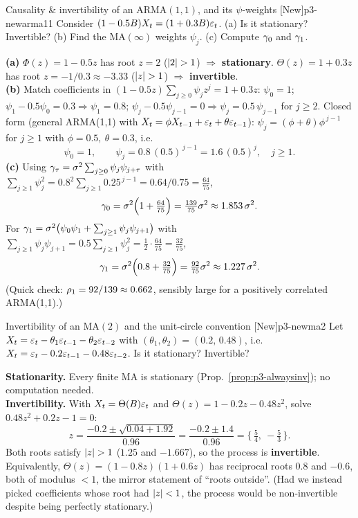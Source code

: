 \begin{exercise}{Causality \& invertibility of an $\mathrm{ARMA}(1,1)$, and its $\psi$-weights \quad\textnormal{[New]}}{p3-newarma11}
Consider $(1-0.5B)X_t=(1+0.3B)\varepsilon_t$. (a) Is it stationary? Invertible?
(b) Find the $\mathrm{MA}(\infty)$ weights $\psi_j$. (c) Compute $\gamma_0$ and
$\gamma_1$.
\end{exercise}
\begin{solution}
\textbf{(a)} $\Phi(z)=1-0.5z$ has root $z=2$ ($\left\lvert 2 \right\rvert>1$) $\Rightarrow$
\textbf{stationary}. $\Theta(z)=1+0.3z$ has root $z=-1/0.3\approx-3.33$
($\left\lvert z \right\rvert>1$) $\Rightarrow$ \textbf{invertible}.\\
\textbf{(b)} Match coefficients in $(1-0.5z)\sum_{j\ge0}\psi_j z^j=1+0.3z$:
$\psi_0=1$; $\psi_1-0.5\psi_0=0.3\Rightarrow\psi_1=0.8$;
$\psi_j-0.5\psi_{j-1}=0\Rightarrow\psi_j=0.5\,\psi_{j-1}$ for $j\ge2$. Closed
form (general ARMA(1,1) with $X_t=\phi X_{t-1}+\varepsilon_t+\theta\varepsilon_{t-1}$):
$\psi_j=(\phi+\theta)\phi^{\,j-1}$ for $j\ge1$ with $\phi=0.5,\ \theta=0.3$, i.e.
\[
\psi_0=1,\qquad \psi_j=0.8\,(0.5)^{\,j-1}=1.6\,(0.5)^{j},\quad j\ge1 .
\]
\textbf{(c)} Using $\gamma_\tau=\sigma^2\sum_{j\ge0}\psi_j\psi_{j+\tau}$ with
$\sum_{j\ge1}\psi_j^2=0.8^2\sum_{j\ge1}0.25^{\,j-1}=0.64/0.75=\tfrac{64}{75}$,
\[
\gamma_0=\sigma^2\Big(1+\tfrac{64}{75}\Big)=\tfrac{139}{75}\sigma^2\approx1.853\,\sigma^2 .
\]
For $\gamma_1=\sigma^2\big(\psi_0\psi_1+\sum_{j\ge1}\psi_j\psi_{j+1}\big)$ with
$\sum_{j\ge1}\psi_j\psi_{j+1}=0.5\sum_{j\ge1}\psi_j^2=\tfrac12\cdot\tfrac{64}{75}=\tfrac{32}{75}$,
\[
\gamma_1=\sigma^2\Big(0.8+\tfrac{32}{75}\Big)=\tfrac{92}{75}\sigma^2\approx1.227\,\sigma^2 .
\]
(Quick check: $\rho_1=92/139\approx0.662$, sensibly large for a positively
correlated ARMA(1,1).)
\end{solution}

\begin{exercise}{Invertibility of an $\mathrm{MA}(2)$ and the unit-circle convention \quad\textnormal{[New]}}{p3-newma2}
Let $X_t=\varepsilon_t-\theta_1\varepsilon_{t-1}-\theta_2\varepsilon_{t-2}$ with
$(\theta_1,\theta_2)=(0.2,\,0.48)$, i.e.\
$X_t=\varepsilon_t-0.2\varepsilon_{t-1}-0.48\varepsilon_{t-2}$. Is it stationary? Invertible?
\end{exercise}
\begin{solution}
\textbf{Stationarity.} Every finite MA is stationary
(Prop.~\ref{prop:p3-alwaysinv}); no computation needed.\\
\textbf{Invertibility.} With $X_t=\Theta(B)\varepsilon_t$ and
$\Theta(z)=1-0.2z-0.48z^2$, solve $0.48z^2+0.2z-1=0$:
\[
z=\frac{-0.2\pm\sqrt{0.04+1.92}}{0.96}=\frac{-0.2\pm1.4}{0.96}
=\Big\{\,\tfrac{5}{4},\ -\tfrac{5}{3}\,\Big\}.
\]
Both roots satisfy $\left\lvert z \right\rvert>1$ ($1.25$ and $-1.667$), so the process is
\textbf{invertible}. Equivalently, $\Theta(z)=(1-0.8z)(1+0.6z)$ has reciprocal
roots $0.8$ and $-0.6$, both of modulus $<1$, the mirror statement of ``roots
outside''. (Had we instead picked coefficients whose root had $\left\lvert z \right\rvert<1$, the
process would be non-invertible despite being perfectly stationary.)
\end{solution}

